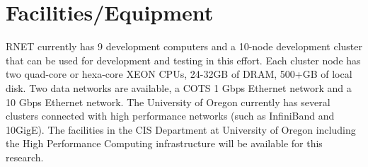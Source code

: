 \section{Facilities/Equipment}
%
%




RNET currently has 9 development computers and a 10-node development cluster 
that can be used for development and testing in this effort. Each cluster node 
has two quad-core or hexa-core XEON CPUs, 24-32GB of DRAM, 500+GB of local disk. 
Two data networks are available, a COTS 1 Gbps Ethernet network and a 10 Gbps 
Ethernet network. The University of Oregon currently has several clusters connected with high performance networks (such as InfiniBand and 10GigE).
The facilities in the CIS Department at University of Oregon including the High Performance Computing infrastructure will be available 
for this research. 

